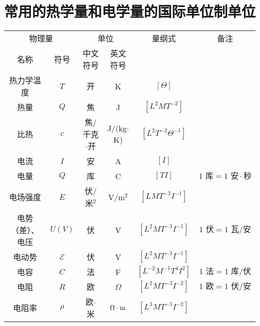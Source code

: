 \chapter{常用的热学量和电学量的国际单位制单位}

\begin{table}[htbp]
    \centering
    \begin{tabular}{cc|cc|c|c}
        \toprule
        \multicolumn{2}{c|}{物理量} & \multicolumn{2}{c|}{单位} & 量纲式 & 备注\\
        名称&符号 &中文符号&英文符号& & \\
        \midrule
        热力学温度      &   $T$               &    开      &    K  &  $[\Theta]$  & \\
        热量      &   $Q$             &     焦     &    J  &  $[L^2MT^{-2}]$ & \\
        比热      &   $c$             &  焦/千克$\cdot $开        & J/(kg$\cdot$K)  & $[L^2T^{-2}\Theta^{-1}]$ & \\  
        电流      &    $I$             &   安       &    A & $[I]$ & \\
        电量      &    $Q$            &    库      &    C & $[TI]$ & $1  \text{ 库}=1 \text{ 安} \cdot \text{秒} $ \\
        电场强度      &  $E$              &  伏/米$^2$        &   V/m$^2$  & $[LMT^{-3}I^{-1}]$ & \\
        电势（差）、电压      & $U(V)$              &    伏      &   V  & $[L^2MT^{-3}I^{-1}]$ & $ 1 \text{ 伏} = 1 \text{ 瓦}/\text{安} $\\
        电动势      &  $\mathcal{E}$              &    伏      &    V & $[L^2MT^{-3}I^{-1}]$ & \\
        电容      &    $C$          &    法      &   F  & $[L^{-2}M^{-1}T^{4}I^{2}]$ & $1 \text{ 法} = 1 \text{ 库}/\text{伏}$ \\
        电阻      &    $R$        &     欧     &    $\Omega$       & $[L^{2}MT^{-3}I^{-2}]$ & $1 \text{ 欧}=1 \text{ 伏}/\text{安}$ \\
        电阻率      &    $\rho$          &   欧$\cdot$米       & $\Omega\cdot{\rm m}$   &  $[L^{3}MT^{-3}I^{-2}]$ & \\
        \bottomrule
    \end{tabular}
\end{table}

